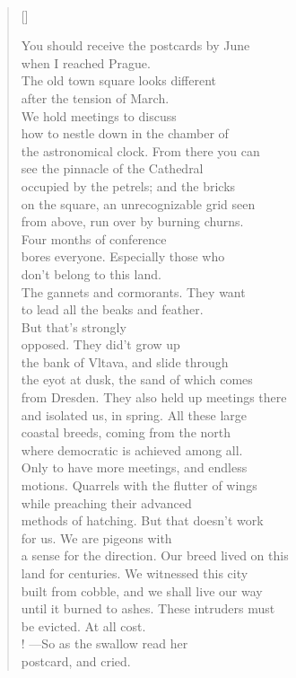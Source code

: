 \documentclass{book}
\begin{document}
\newpage
\poemtitle{\textcolor[RGB]{165,15,15}{The Alternative Spring}}
\hspace*{\fill} \\
\settowidth{\versewidth}{a sense for the direction. Our breed lived on this }
\begin{verse}[\versewidth]

    You should receive the postcards by June\\
    when I reached Prague. \\
    The old town square looks different\\
    after the tension of March. \\
    We hold meetings to discuss\\
    how to nestle down in the chamber of\\
    the astronomical clock. From there you can\\
    see the pinnacle of the Cathedral\\
    occupied by the petrels; and the bricks\\
    on the square, an unrecognizable grid seen\\
    from above, run over by burning churns. \\
    Four months of conference\\
    bores everyone. Especially those who \\
    don't belong to this land. \\
    The gannets and cormorants. They want\\
    to lead all the beaks and feather. \\
    But that's strongly\\
    opposed. They did't grow up \\
    the bank of Vltava, and slide through\\
    the eyot at dusk, the sand of which comes\\
    from Dresden. They also held up meetings there\\
    and isolated us, in spring. All these large\\
    coastal breeds, coming from the north\\
    where democratic is achieved among all.\\
    Only to have more meetings, and endless\\
    motions. Quarrels with the flutter of wings\\
    while preaching their advanced\\
    methods of hatching. But that doesn't work\\
    for us. We are pigeons with\\
    a sense for the direction. Our breed lived on this \\
    land for centuries. We witnessed this city\\
    built from cobble, and we shall live our way\\
    until it burned to ashes. These intruders must\\
    be evicted. At all cost. \\! 
    ---So as the swallow read her \\
    postcard, and cried.
\end{verse}
\end{document}
